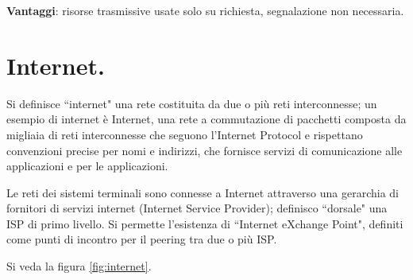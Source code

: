 \documentclass[11pt, italian, openany]{book}
\begin{document}
\begin{sloppypar}
\textbf{Vantaggi}: risorse trasmissive usate solo su richiesta, segnalazione non necessaria.

\section{Internet.}
Si definisce ``internet" una rete costituita da due o pi\`u reti interconnesse; un esempio di internet \`e Internet, una rete a commutazione di
pacchetti composta da migliaia di reti interconnesse che seguono l'Internet Protocol e rispettano convenzioni precise per nomi e indirizzi, che
fornisce servizi di comunicazione alle applicazioni e per le applicazioni.

Le reti dei sistemi terminali sono connesse a Internet attraverso una gerarchia di fornitori di servizi internet (Internet Service Provider);
definisco ``dorsale" una ISP di primo livello. Si permette l'esistenza di ``Internet eXchange Point", definiti come punti di incontro per il peering
tra due o pi\`u ISP.

Si veda la figura \ref{fig:internet}.


\end{sloppypar}
\end{document}

